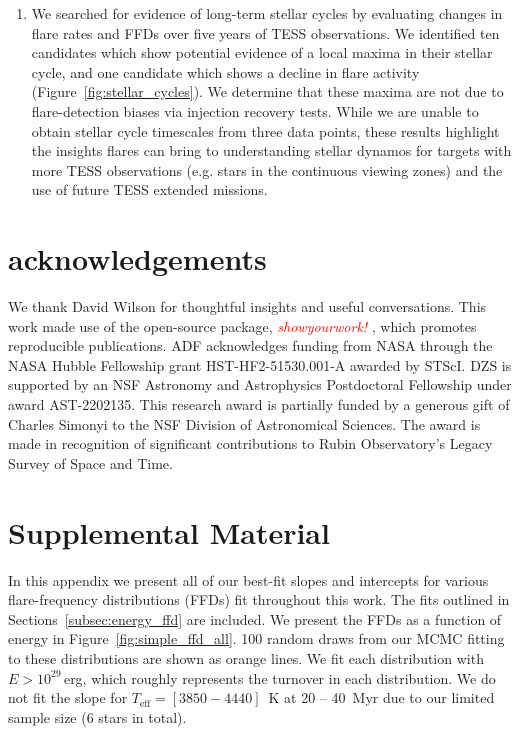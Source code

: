 \documentclass[twocolumn, linenumbers]{aastex631}
\begin{document}
\begin{enumerate}
  \item We searched for evidence of long-term stellar cycles by evaluating changes in flare rates and FFDs  over five years of TESS observations. We identified ten candidates which show potential evidence of a local maxima in their stellar cycle, and one candidate which shows a decline in flare activity (Figure~\ref{fig:stellar_cycles}). We determine that these maxima are not due to flare-detection biases via injection recovery tests. While we are unable to obtain stellar cycle timescales from three data points, these results highlight the insights flares can bring to understanding stellar dynamos for targets with more TESS observations (e.g. stars in the continuous viewing zones) and the use of future TESS extended missions.

\end{enumerate}


\vspace{3mm}



\section{acknowledgements}

We thank David Wilson for thoughtful insights and useful conversations. This work made use of the open-source package, \textcolor{red}{\textit{showyourwork!}} \citep{luger2021}, which promotes reproducible publications. ADF acknowledges funding from NASA through the NASA Hubble Fellowship grant HST-HF2-51530.001-A awarded by STScI. DZS is supported by an NSF Astronomy and Astrophysics Postdoctoral Fellowship under award AST-2202135. This research award is partially funded by a generous gift of Charles Simonyi to the NSF Division of Astronomical Sciences.  The award is made in recognition of significant contributions to Rubin Observatory’s Legacy Survey of Space and Time.



\appendix
\restartappendixnumbering

\section{Supplemental Material}\label{appendix:supp_ffds}

In this appendix we present all of our best-fit slopes and intercepts for various flare-frequency distributions (FFDs) fit throughout this work. The fits outlined in Sections~\ref{subsec:energy_ffd} are included. We present the FFDs as a function of energy in Figure~\ref{fig:simple_ffd_all}.  100 random draws from our MCMC fitting to these distributions are shown as orange lines. We fit each distribution with $E > 10^{29}$\,erg, which roughly represents the turnover in each distribution. We do not fit the slope for $T_\textrm{eff} = [3850 - 4440]$~K at 20 -- 40~Myr due to our limited sample size (6 stars in total).
\end{document}
